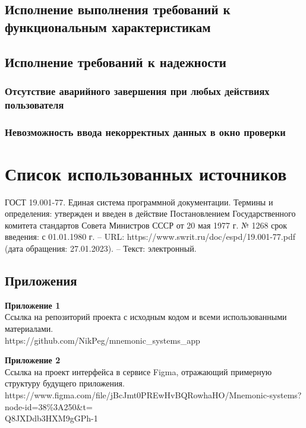 \documentclass[draft]{article}
\newcommand\zz[1]{\par{\normalsize\strut #1} \hfill\ignorespaces}
\begin{document}
\subsection{Исполнение выполнения требований к функциональным характеристикам}
\subsection{Исполнение требований к надежности}
\subsubsection{Отсутствие аварийного завершения при любых действиях пользователя}
\subsubsection{Невозможность ввода некорректных данных в окно проверки}
\newpage
{}
\section*{Список использованных источников}
\begin{thebibliography}{}
 ГОСТ 19.001-77. Единая система программной документации. Термины и определения: утвержден и введен в действие Постановлением Государственного комитета стандартов Совета Министров СССР от 20 мая 1977 г. № 1268 срок введения: с 01.01.1980 г. – URL: https://www.swrit.ru/doc/espd/19.001-77.pdf (дата обращения: 27.01.2023). – Текст: электронный.
\end{thebibliography}
\newpage
\begin{center}
\section*{Приложения}
\end{center}
\zz{}\textbf{Приложение 1\\}
Ссылка на репозиторий проекта с исходным кодом и всеми использованными материалами.\\
https://github.com/NikPeg/mnemonic\_systems\_app\\
\zz{}\textbf{Приложение 2\\}
Ссылка на проект интерфейса в сервисе Figma, отражающий примерную структуру будущего приложения.\\
https://www.figma.com/file/jBcJmt0PREwHvBQRowhaHO/Mnemonic-systems?node-id=38\%3A250\&t=\\
Q8JXDdb3HXM9gGPh-1\\
\end{document}
